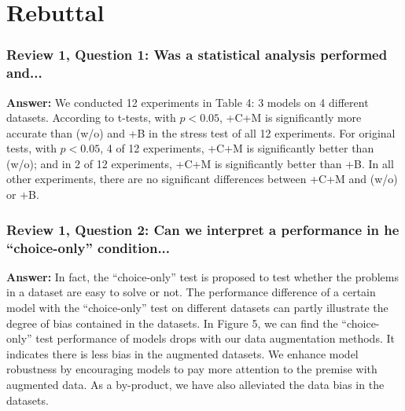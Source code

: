 \documentclass{article}
\begin{document}
\noindent{}

\section*{Rebuttal}
\subsubsection*{Review 1, Question 1: Was a statistical analysis performed and...}

\textbf{Answer:} We conducted 12 experiments in Table 4: 3 models on 4 different
datasets. According to t-tests, with $p<0.05$, +C+M is significantly more
accurate than (w/o) and +B in the stress test of all 12 experiments.
For original tests, with $p<0.05$, 4 of 12 experiments, 
+C+M is significantly better than (w/o); 
and in 2 of 12 experiments, +C+M is significantly better than +B.
In all other experiments, there are no significant differences between +C+M and
(w/o) or +B.

\subsubsection*{Review 1, Question 2: Can we interpret a performance in he ``choice-only'' condition...}

\textbf{Answer:} In fact, the ``choice-only'' test is proposed to test whether the problems in 
a dataset are easy to solve or not. The performance difference of a certain model 
with the ``choice-only'' test on different datasets can 
partly illustrate the degree of bias contained in the datasets.
In Figure 5, we can find the ``choice-only'' test performance 
of models drops with our data augmentation methods. It indicates there is less bias in 
the augmented datasets. We enhance model robustness by encouraging 
models to pay more attention to the premise with augmented data. 
As a by-product, we have also alleviated the data bias in the datasets.
\end{document}
